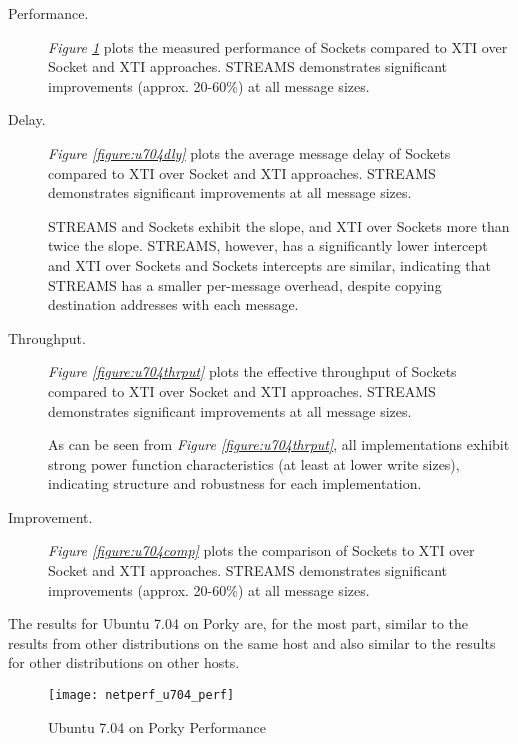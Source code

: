 \documentclass[letterpaper,final,notitlepage,twocolumn,10pt,twoside]{article}
\begin{document}
\begin{description}

\item[Performance.]

\textit{Figure \ref{figure:u704perf}}
plots the measured performance of Sockets compared to XTI over Socket and XTI approaches.  STREAMS
demonstrates significant improvements (approx. 20-60\%) at all message sizes.

\item[Delay.]

\textit{Figure \ref{figure:u704dly}}
plots the average message delay of Sockets compared to XTI over Socket and XTI approaches.  STREAMS
demonstrates significant improvements at all message sizes.

STREAMS and Sockets exhibit the slope, and XTI over Sockets more than twice the slope.  STREAMS,
however, has a significantly lower intercept and XTI over Sockets and Sockets intercepts are
similar, indicating that STREAMS has a smaller per-message overhead, despite copying destination
addresses with each message.

\item[Throughput.]

\textit{Figure \ref{figure:u704thrput}}
plots the effective throughput of Sockets compared to XTI over Socket and XTI approaches.  STREAMS
demonstrates significant improvements at all message sizes.

As can be seen from \textit{Figure \ref{figure:u704thrput}}, all implementations exhibit strong
power function characteristics (at least at lower write sizes), indicating structure and robustness
for each implementation.

\item[Improvement.]

\textit{Figure \ref{figure:u704comp}}
plots the comparison of Sockets to XTI over Socket and XTI approaches.  STREAMS demonstrates
significant improvements (approx. 20-60\%) at all message sizes.

\end{description}

The results for Ubuntu 7.04 on Porky are, for the most part, similar to the results from other
distributions on the same host and also similar to the results for other distributions on other
hosts.

\begin{figure}[p]
\center\texttt{[image: netperf\_u704\_perf]}
\caption[Ubuntu 7.04 on Porky Performance]{Ubuntu 7.04 on Porky Performance}
\label{figure:u704perf}
\end{figure}
\end{document}

